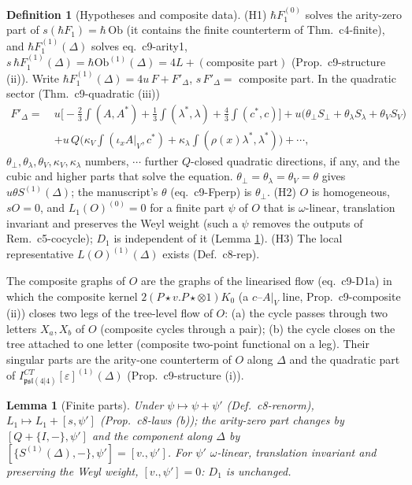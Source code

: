 \documentclass[11pt]{article}
\numberwithin{equation}{section}
\theoremstyle{plain}
\newtheorem{lemma}[theorem]{Lemma}
\theoremstyle{definition}
\newtheorem{definition}[theorem]{Definition}
\begin{document}
\begin{definition}[Hypotheses and composite data]
\label{def:tl-H}
(H1) $\hbar F_1^{(0)}$ solves the arity-zero part of $s(\hbar F_1)=\hbar\,\mathrm{Ob}$ (it contains the finite counterterm of Thm.~c4-finite), and $\hbar F_1^{(1)}(\Delta)$ solves eq.~c9-arity1, $s\,\hbar F_1^{(1)}(\Delta)=\hbar\mathrm{Ob}^{(1)}(\Delta)=4L+(\text{composite part})$ (Prop.~c9-structure (ii)). Write $\hbar F_1^{(1)}(\Delta)=4u\,F+F'_\Delta$, $s\,F'_\Delta=$ composite part. In the quadratic sector (Thm.~c9-quadratic (iii))
\[
\begin{aligned}F'_\Delta=\ &u\Big[-\tfrac23\int(A,A^*)+\tfrac13\int(\lambda^*,\lambda)+\tfrac43\int(c^*,c)\Big]+u\big(\theta_\perp S_\perp+\theta_\lambda S_\lambda+\theta_VS_V\big)\\ &+u\,Q\Big(\kappa_V\int(\iota_xA|_V,c^*)+\kappa_\lambda\int(\rho(x)\lambda^*,\lambda^*)\Big)+\cdots,\end{aligned}
\]
$\theta_\perp,\theta_\lambda,\theta_V,\kappa_V,\kappa_\lambda$ numbers, $\cdots$ further $Q$-closed quadratic directions, if any, and the cubic and higher parts that solve the equation. $\theta_\perp=\theta_\lambda=\theta_V=\theta$ gives $u\theta S^{(1)}(\Delta)$; the manuscript's $\theta$ (eq.~c9-Fperp) is $\theta_\perp$.
(H2) $O$ is homogeneous, $sO=0$, and $L_1(O)^{(0)}=0$ for a finite part $\psi$ of $O$ that is $\omega$-linear, translation invariant and preserves the Weyl weight (such a $\psi$ removes the outputs of Rem.~c5-cocycle); $D_1$ is independent of it (Lemma \ref{lem:tl-psi}).
(H3) The local representative $L(O)^{(1)}(\Delta)$ exists (Def.~c8-rep).

The composite graphs of $O$ are the graphs of the linearised flow (eq.~c9-D1a) in which the composite kernel $2(P\star v.P\star\otimes1)K_0$ (a $c$--$A|_V$ line, Prop.~c9-composite (ii)) closes two legs of the tree-level flow of $O$: (a) the cycle passes through two letters $X_a,X_b$ of $O$ (composite cycles through a pair); (b) the cycle closes on the tree attached to one letter (composite two-point functional on a leg). Their singular parts are the arity-one counterterm of $O$ along $\Delta$ and the quadratic part of $I^{CT}_{\mathfrak{psl}(4|4)}[\varepsilon]^{(1)}(\Delta)$ (Prop.~c9-structure (i)).
\end{definition}

\begin{lemma}[Finite parts]
\label{lem:tl-psi}
Under $\psi\mapsto\psi+\psi'$ (Def.~c8-renorm), $L_1\mapsto L_1+[s,\psi']$ (Prop.~c8-laws (b)); the arity-zero part changes by $[Q+\{I,-\},\psi']$ and the component along $\Delta$ by $[\{S^{(1)}(\Delta),-\},\psi']=[v.,\psi']$. For $\psi'$ $\omega$-linear, translation invariant and preserving the Weyl weight, $[v.,\psi']=0$: $D_1$ is unchanged.
\end{lemma}
\end{document}
